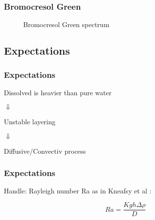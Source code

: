 \begin{frame}
	\frametitle{Bromocresol Green}
	
	\begin{figure}
	  \centering
	  \caption{Bromocresol Green spectrum}
	\end{figure}
\end{frame}

\subsection{Expectations}
\begin{frame}
	\frametitle{Expectations}
	\vspace{1cm} %
	
	\centering
	Dissolved \COT is heavier than pure water
	
	\pause
	$\Downarrow$
	
	Unstable layering
	
	\pause
	$\Downarrow$
	
	Diffusive/Convectiv process
	
\end{frame}

\begin{frame}
	\frametitle{Expectations}
	\vspace{1cm} %
	
	Handle: Rayleigh number Ra as in Kneafsy et al \cite{2010:CO2}:
	
	\begin{equation*}
	  Ra = \frac{Kgh \Delta\rho}{D}
	\end{equation*}

	
\end{frame}

